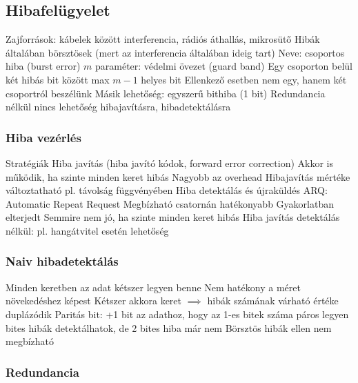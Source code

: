 \documentclass[12pt,a4paper]{article}
\begin{document}
\pagebreak

\subsection{Hibafelügyelet}

\begin{outline}
	\1 Zajforrások: kábelek között interferencia, rádiós áthallás, mikrosütő
	\1 Hibák általában börsztösek (mert az interferencia általában ideig tart)
		\2 Neve: csoportos hiba (burst error)
		\2 $m$ paraméter: védelmi övezet (guard band)
			\3 Egy csoporton belül két hibás bit között max $m-1$ helyes bit
			\3 Ellenkező esetben nem egy, hanem két csoportról beszélünk
		\2 Másik lehetőség: egyszerű bithiba (1 bit)
	\1 Redundancia nélkül nincs lehetőség hibajavításra, hibadetektálásra
\end{outline}

\subsubsection{Hiba vezérlés}

\begin{outline}
	\1 Stratégiák
		\2 Hiba javítás (hiba javító kódok, forward error correction)
			\3 Akkor is működik, ha szinte minden keret hibás
			\3 Nagyobb az overhead
			\3 Hibajavítás mértéke változtatható pl. távolság függvényében
		\2 Hiba detektálás és újraküldés
			\3 ARQ: Automatic Repeat Request
			\3 Megbízható csatornán hatékonyabb
			\3 Gyakorlatban elterjedt
			\3 Semmire nem jó, ha szinte minden keret hibás
	\1 Hiba javítás detektálás nélkül: pl. hangátvitel esetén lehetőség
\end{outline}

\subsubsection{Naiv hibadetektálás}

\begin{outline}
	\1 Minden keretben az adat kétszer legyen benne
		\2 Nem hatékony a méret növekedéshez képest
		\2 Kétszer akkora keret $\implies$ hibák számának várható értéke duplázódik
	\1 Paritás bit: +1 bit az adathoz, hogy az 1-es bitek száma páros legyen
		 bites hibák detektálhatok, de 2 bites hiba már nem
		\2 Börsztös hibák ellen nem megbízható
\end{outline}

\pagebreak

\subsubsection{Redundancia}
\end{document}
